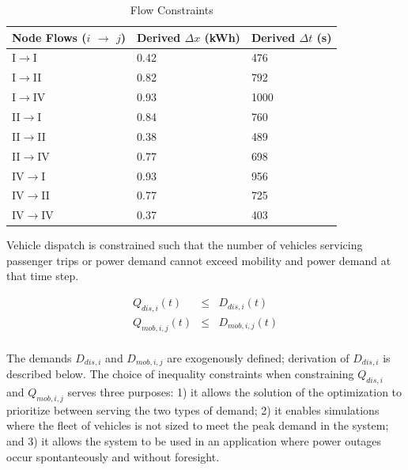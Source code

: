\documentclass[journal]{IEEEtran}
\begin{document}
\begin{table}[!htbp]
    \renewcommand{\arraystretch}{1}
    \caption{Flow Constraints}
    \label{tab:flow_constraints}
    \centering
    \def\colmargin{6.75cm}
    \begin{tabular}{lll}
    \hline
    \textbf{Node Flows ($i$ $\rightarrow$ $j$)} & \textbf{Derived} $\Delta x$ (kWh) & \textbf{Derived} $\Delta t$ (s) \\
    \hline
    I$\rightarrow$I & 0.42  & 476  \\
    I$\rightarrow$II & 0.82  & 792  \\
    I$\rightarrow$IV & 0.93  & 1000  \\
    II$\rightarrow$I & 0.84  & 760  \\
    II$\rightarrow$II & 0.38  & 489  \\
    II$\rightarrow$IV & 0.77  & 698  \\
    IV$\rightarrow$I & 0.93  & 956  \\
    IV$\rightarrow$II & 0.77  & 725  \\
    IV$\rightarrow$IV & 0.37  & 403  \\
    \hline
    \end{tabular}
\end{table}

Vehicle dispatch is constrained such that the number of vehicles servicing passenger trips or power demand cannot exceed mobility and power demand at that time step.

\begin{eqnarray*}
   Q_{dis,i}(t) & \le & D_{dis,i}(t) \\
   Q_{mob,i,j}(t) & \le & D_{mob,i,j}(t) \\
\end{eqnarray*}

The demands $D_{dis,i}$ and $D_{mob,i,j}$ are exogenously defined; derivation of $D_{dis,i}$ is described below. The choice of inequality constraints when constraining $Q_{dis,i}$ and $Q_{mob,i,j}$ serves three purposes: 1) it allows the solution of the optimization to prioritize between serving the two types of demand; 2) it enables simulations where the fleet of vehicles is not sized to meet the peak demand in the system; and 3) it allows the system to be used in an application where power outages occur spontanteously and without foresight.
\end{document}
